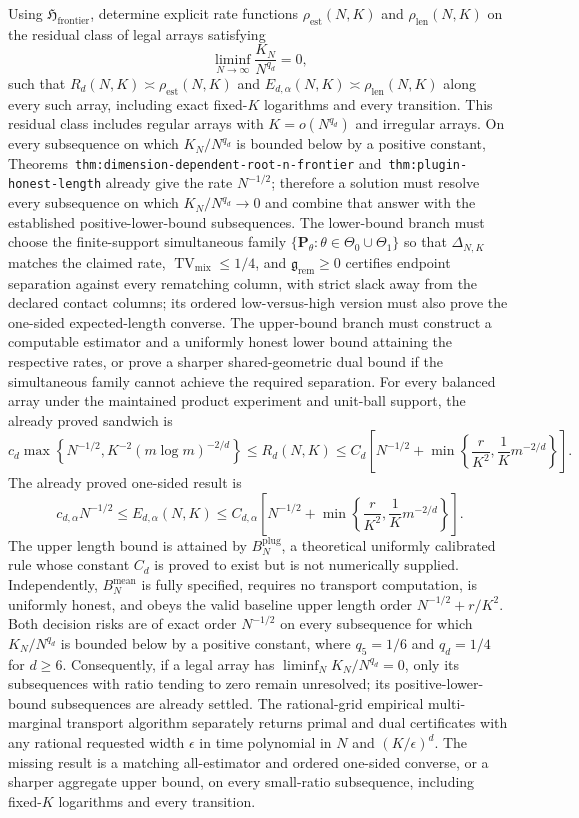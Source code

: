 Using \(\mathfrak H_{\mathrm{frontier}}\), determine explicit rate functions \(\rho_{\mathrm{est}}(N,K)\) and \(\rho_{\mathrm{len}}(N,K)\) on the residual class of legal arrays satisfying
\[
\liminf_{N\to\infty}\frac{K_N}{N^{q_d}}=0,
\]
such that \(R_d(N,K)\asymp\rho_{\mathrm{est}}(N,K)\) and \(E_{d,\alpha}(N,K)\asymp\rho_{\mathrm{len}}(N,K)\) along every such array, including exact fixed-\(K\) logarithms and every transition. This residual class includes regular arrays with \(K=o(N^{q_d})\) and irregular arrays. On every subsequence on which \(K_N/N^{q_d}\) is bounded below by a positive constant, Theorems~\texttt{thm:dimension-dependent-root-n-frontier} and~\texttt{thm:plugin-honest-length} already give the rate \(N^{-1/2}\); therefore a solution must resolve every subsequence on which \(K_N/N^{q_d}\to0\) and combine that answer with the established positive-lower-bound subsequences. The lower-bound branch must choose the finite-support simultaneous family \(\{\mathbf P_\theta:\theta\in\Theta_0\cup\Theta_1\}\) so that \(\Delta_{N,K}\) matches the claimed rate, \(\operatorname{TV}_{\mathrm{mix}}\le1/4\), and \(\mathfrak g_{\mathrm{rem}}\ge0\) certifies endpoint separation against every rematching column, with strict slack away from the declared contact columns; its ordered low-versus-high version must also prove the one-sided expected-length converse. The upper-bound branch must construct a computable estimator and a uniformly honest lower bound attaining the respective rates, or prove a sharper shared-geometric dual bound if the simultaneous family cannot achieve the required separation.
For every balanced array under the maintained product experiment and unit-ball support, the already proved sandwich is
\[
c_d\max\left\{N^{-1/2},K^{-2}(m\log m)^{-2/d}\right\}
\le R_d(N,K)
\le C_d\left[N^{-1/2}+\min\left\{\frac r{K^2},\frac1K m^{-2/d}\right\}\right].
\]
The already proved one-sided result is
\[
c_{d,\alpha}N^{-1/2}
\le E_{d,\alpha}(N,K)
\le C_{d,\alpha}\left[N^{-1/2}+\min\left\{\frac r{K^2},\frac1K m^{-2/d}\right\}\right].
\]
The upper length bound is attained by \(B_N^{\mathrm{plug}}\), a theoretical uniformly calibrated rule whose constant \(C_d\) is proved to exist but is not numerically supplied. Independently, \(B_N^{\mathrm{mean}}\) is fully specified, requires no transport computation, is uniformly honest, and obeys the valid baseline upper length order \(N^{-1/2}+r/K^2\). Both decision risks are of exact order \(N^{-1/2}\) on every subsequence for which \(K_N/N^{q_d}\) is bounded below by a positive constant, where \(q_5=1/6\) and \(q_d=1/4\) for \(d\ge6\). Consequently, if a legal array has \(\liminf_N K_N/N^{q_d}=0\), only its subsequences with ratio tending to zero remain unresolved; its positive-lower-bound subsequences are already settled. The rational-grid empirical multi-marginal transport algorithm separately returns primal and dual certificates with any rational requested width \(\epsilon\) in time polynomial in \(N\) and \((K/\epsilon)^d\). The missing result is a matching all-estimator and ordered one-sided converse, or a sharper aggregate upper bound, on every small-ratio subsequence, including fixed-\(K\) logarithms and every transition.
